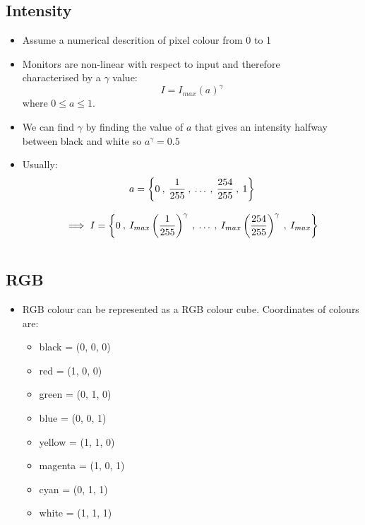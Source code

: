 \subsection{Intensity}

\begin{itemize}
  \item Assume a numerical descrition of pixel colour from 0 to 1
  \item Monitors are non-linear with respect to input and therefore \\ characterised by a $\gamma$ value:
    \begin{equation*}
      I = I_{max}(a)^{\gamma}
    \end{equation*}
      where $0 \leq a \leq 1$.
  \item We can find $\gamma$ by finding the value of $a$ that gives an intensity halfway between black and white so $a^{\gamma} = 0.5$
  \item Usually:
    \begin{gather*}
        a = \left\{ 0 \:, \: \frac{1}{255} \:,\: \ldots \:, \: \frac{254}{255} \:, \: 1 \right\} \\[2ex]
        \vspace{10pt}
        \implies I = \left\{ 0 \:, \: I_{max}\left(\frac{1}{255}\right)^{\gamma} \:,\: \ldots \:, \: I_{max}\left(\frac{254}{255}\right)^{\gamma} \:, \: I_{max} \right\}
    \end{gather*}
\end{itemize}

\subsection{RGB}

\begin{itemize}
  \item RGB colour can be represented as a RGB colour cube. Coordinates of colours are:
    \begin{itemize}
      \item black = (0, 0, 0)
      \item red = (1, 0, 0)
      \item green = (0, 1, 0)
      \item blue = (0, 0, 1)
      \item yellow = (1, 1, 0)
      \item magenta = (1, 0, 1)
      \item cyan = (0, 1, 1)
      \item white = (1, 1, 1)
    \end{itemize}
\end{itemize}
